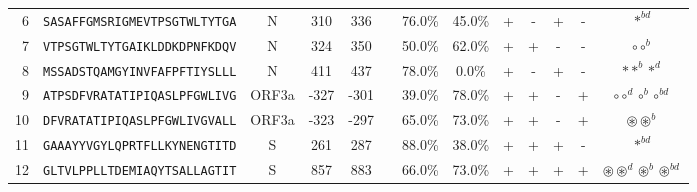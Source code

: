 \begin{tabular}{rcccccccccccc}
6  &  \texttt{SASAFFGMSRIGMEVTPSGTWLTYTGA} &       N &    310 &   336 &                &                          76.0\% &                           45.0\% &          + &           - &          + &           - &                                                                                                                            $ \ast^{bd} $ \\
7  &  \texttt{VTPSGTWLTYTGAIKLDDKDPNFKDQV} &       N &    324 &   350 &                &                          50.0\% &                           62.0\% &          + &           + &          - &           - &                                                                                                                        $ \circ \circ^b $ \\
8  &  \texttt{MSSADSTQAMGYINVFAFPFTIYSLLL} &       N &    411 &   437 &                &                          78.0\% &                            0.0\% &          + &           - &          + &           - &                                                                                                                   $ \ast \ast^b \ast^d $ \\
9  &  \texttt{ATPSDFVRATATIPIQASLPFGWLIVG} &   ORF3a &   -327 &  -301 &                &                          39.0\% &                           78.0\% &          + &           + &          - &           + &                                                                                                     $ \circ \circ^d \circ^b \circ^{bd} $ \\
10 &  \texttt{DFVRATATIPIQASLPFGWLIVGVALL} &   ORF3a &   -323 &  -297 &                &                          65.0\% &                           73.0\% &          + &           + &          - &           + &                                                                                                            $ \circledast \circledast^b $ \\
11 &  \texttt{GAAAYYVGYLQPRTFLLKYNENGTITD} &       S &    261 &   287 &                &                          88.0\% &                           38.0\% &          + &           + &          + &           - &                                                                                                                            $ \ast^{bd} $ \\
12 &  \texttt{GLTVLPPLLTDEMIAQYTSALLAGTIT} &       S &    857 &   883 &                &                          66.0\% &                           73.0\% &          + &           + &          + &           + &                                                                             $ \circledast \circledast^d \circledast^b \circledast^{bd} $ \\

\end{tabular}
